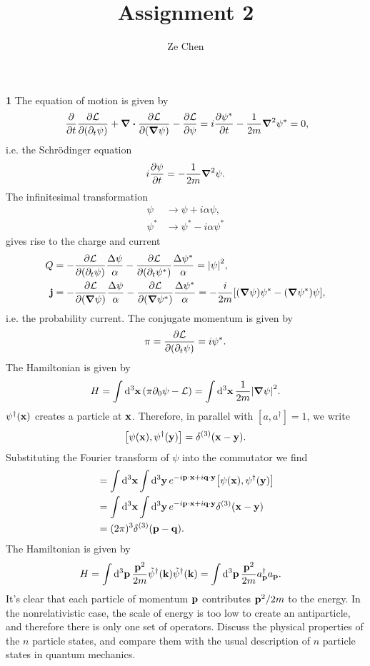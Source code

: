 \documentclass{article}
\title{Assignment 2}
\author{Ze Chen}
\makeatletter
\newcommand*{\shifttext}[1]{%
  \settowidth{\@tempdima}{#1}%
  \hspace{-\@tempdima}#1%
}
\newcommand{\plabel}[1]{%
\shifttext{\textbf{#1}\quad}%
}
\makeatother
\begin{document}
\maketitle

% 
% 

\plabel{1}%
The equation of motion is given by
\begin{align*}
    &\phantom{{}={}} \pdv{}{t}\pdv{\mathcal{L}}{(\partial_t\psi)} + \div \pdv{\mathcal{L}}{(\grad \psi)} - \pdv{\mathcal{L}}{\psi} = i\pdv{\psi^*}{t} - \frac{1}{2m}\grad^2\psi^* = 0,
\end{align*}
i.e. the Schr\"odinger equation
\[ i\pdv{\psi}{t} = -\frac{1}{2m}\grad^2 \psi. \]
The infinitesimal transformation
\begin{align*}
    \psi &\rightarrow \psi + i\alpha\psi, \\
    \psi^* &\rightarrow \psi^* - i\alpha\psi^*
\end{align*}
gives rise to the charge and current
\begin{align*}
    Q &= -\pdv{\mathcal{L}}{(\partial_t \psi)}\frac{\Delta \psi}{\alpha} - \pdv{\mathcal{L}}{(\partial_t \psi^*)}\frac{\Delta \psi^*}{\alpha} = \abs{\psi}^2, \\
    \vb{j} &= -\pdv{\mathcal{L}}{(\grad \psi)}\frac{\Delta \psi}{\alpha} - \pdv{\mathcal{L}}{(\grad \psi^*)}\frac{\Delta \psi^*}{\alpha} = -\frac{i}{2m}\qty[(\grad\psi)\psi^* - (\grad \psi^*)\psi],
\end{align*}
i.e. the probability current.
The conjugate momentum is given by
\[ \pi = \pdv{\mathcal{L}}{(\partial_t \psi)} = i\psi^*. \]
The Hamiltonian is given by
\[ H = \int \dd{^3 \vb{x}} \qty(\pi \partial_0\psi - \mathcal{L}) = \int\dd{^3\vb{x}} \frac{1}{2m}\abs{\grad\psi}^2. \]
$\psi^\dagger(\vb{x})$ creates a particle at $\vb{x}$.
Therefore, in parallel with $[a,a^\dagger] = 1$, we write
\[ \qty[\psi(\vb{x}),\psi^\dagger(\vb{y})] = \delta^{(3)}(\vb{x} - \vb{y}). \]
Substituting the Fourier transform of $\psi$ into the commutator we find
\begin{align*}
    [a_{\vb{p}},a_{\vb{q}}^\dagger] &= \int \dd{^3\vb{x}} \int \dd{^3\vb{y}} e^{-i\vb{p}\cdot \vb{x} + i\vb{q}\cdot\vb{y}}\qty[\psi(\vb{x}),\psi^\dagger(\vb{y})] \\
    &= \int \dd{^3\vb{x}} \int \dd{^3\vb{y}} e^{-i\vb{p}\cdot \vb{x} + i\vb{q}\cdot\vb{y}}\delta^{(3)}(\vb{x} - \vb{y}) \\
    &= (2\pi)^3\delta^{(3)}(\vb{p} - \vb{q}).
\end{align*}
The Hamiltonian is given by
\begin{align*}
    H &= \int \dd{^3\vb{p}} \frac{\vb{p}^2}{2m} \tilde{\psi}^\dagger(\vb{k})\tilde{\psi}^\dagger(\vb{k}) = \int \dd{^3\vb{p}} \frac{\vb{p}^2}{2m} a_{\vb{p}}^\dagger a_{\vb{p}}.
\end{align*}
It's clear that each particle of momentum $\vb{p}$ contributes $\vb{p}^2/2m$ to the energy.
In the nonrelativistic case, the scale of energy is too low to create an antiparticle, and therefore there is only one set of operators.
{\color{red}Discuss the physical properties of the $n$ particle states,
and compare them with the usual description of $n$ particle states in quantum mechanics.}
\end{document}
